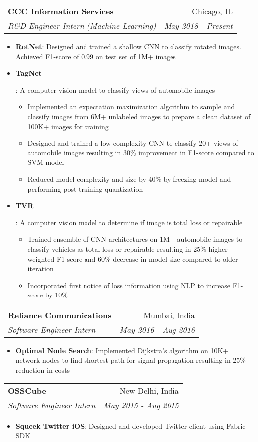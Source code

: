 \documentclass[letterpaper,10pt]{article}
\makeatletter
\newcommand{\resumeItem}[2]{
  \item\small{
    \textbf{#1}{: #2 \vspace{-2pt}}
  }
}
\newcommand{\resumeSubheading}[4]{
  \vspace{-1pt}\item[]
  \begin{tabular*}{0.98\textwidth}{l@{\extracolsep{\fill}}r}
      \hspace{-10pt}\textbf{#1} & #2 \\
      \hspace{-10pt}\textit{\small#3} & \textit{\small #4} \\
    \end{tabular*}\vspace{-5pt}
}
\newcommand{\resumeItemListStart}{\begin{itemize}}
\newcommand{\resumeItemListEnd}{\end{itemize}\vspace{-5pt}}
\makeatother
\begin{document}
    \resumeSubheading
      {CCC Information Services}{Chicago, IL}
      {R\&D Engineer Intern (Machine Learning)}{May 2018 - Present}
      \resumeItemListStart
        \resumeItem{RotNet}
          {Designed and trained a shallow CNN to classify rotated images. Achieved F1-score of 0.99 on test set of 1M+ images}
        \resumeItem{TagNet}
          {A computer vision model to classify views of automobile images
            \begin{itemize}
                \item Implemented an expectation maximization algorithm to sample and classify images from 6M+ unlabeled images to prepare a clean dataset of 100K+ images for training
                \item Designed and trained a low-complexity CNN to classify 20+ views of automobile images resulting in 30\% improvement in  F1-score compared to SVM model
                \item Reduced model complexity and size by 40\% by freezing model and performing post-training quantization
            \end{itemize}
          }
        \resumeItem{TVR}
          {A computer vision model to determine if image is total loss or repairable
          \begin{itemize}
              \item Trained ensemble of CNN architectures on 1M+ automobile images to classify vehicles as total loss or repairable resulting in 25\% higher weighted F1-score and 60\% decrease in model size compared to older iteration
              \item Incorporated first notice of loss information using NLP to increase  F1-score by 10\%
          \end{itemize}
          }
      \resumeItemListEnd

    \resumeSubheading
      {Reliance Communications}{Mumbai, India}
      {Software Engineer Intern}{May 2016 - Aug 2016}
      \resumeItemListStart
        \resumeItem{Optimal Node Search}
          {Implemented Dijkstra's algorithm on 10K+ network nodes to find shortest path for signal propagation resulting in 25\% reduction in costs}
      \resumeItemListEnd

    \resumeSubheading
      {OSSCube}{New Delhi, India}
      {Software Engineer Intern}{May 2015 - Aug 2015}
      \resumeItemListStart
        \resumeItem{Squeek Twitter iOS}
          {Designed and developed Twitter client using Fabric SDK}
      \resumeItemListEnd
\end{document}
